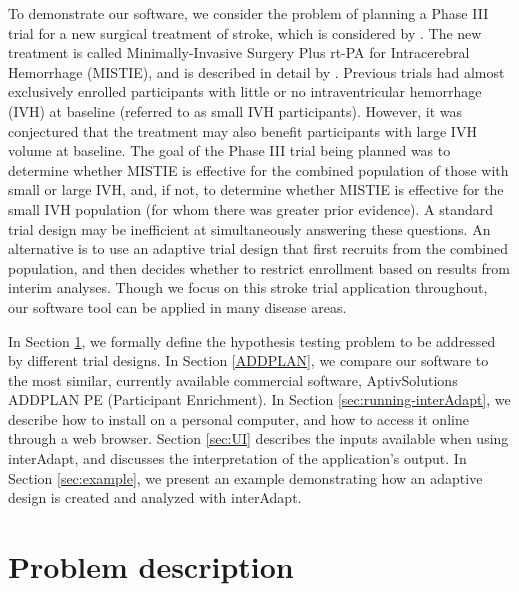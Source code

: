\documentclass[article]{jss}
\begin{document}
To demonstrate our software, we consider the problem of 
 planning a Phase III trial for a new surgical treatment of stroke, which is considered by \cite{Rosenblum2013AdaptMISTIE}.
The new treatment is  called Minimally-Invasive Surgery Plus rt-PA for Intracerebral Hemorrhage (MISTIE), and is described in detail by \cite{MISTIE_prelim2008}. 
Previous trials had almost exclusively enrolled participants with little or no intraventricular hemorrhage (IVH) at baseline (referred to as small IVH participants).
However, it was conjectured that the treatment may also benefit  participants with large IVH volume at baseline.  
The goal of the Phase III trial being planned was to determine whether MISTIE is effective for the combined population of those with small or large IVH, and, if not, to determine whether MISTIE is effective for the small IVH population (for whom there was greater prior evidence). A  standard trial design  may be inefficient at simultaneously answering these questions.
An alternative is to use an adaptive trial design that  first recruits from the combined population, and then decides whether to restrict enrollment based on results from interim  analyses. %
Though we focus on this stroke trial application throughout, our software tool can be applied in many disease areas.

In Section \ref{sec:problemDescription}, we  formally define the hypothesis testing problem to be addressed by different trial designs. In Section \ref{ADDPLAN}, we compare our software to the most similar, currently available commercial software, AptivSolutions ADDPLAN PE (Participant Enrichment). 
In Section \ref{sec:running-interAdapt}, we describe how to install  on a personal computer, and how to access it online through a web browser. Section \ref{sec:UI} describes the inputs available when using \textsf{interAdapt}, and discusses the interpretation of the application's output. In Section \ref{sec:example}, we present an example demonstrating how an adaptive design is created and analyzed with \textsf{interAdapt}. 

\section{Problem description}
\label{sec:problemDescription}
\end{document}
